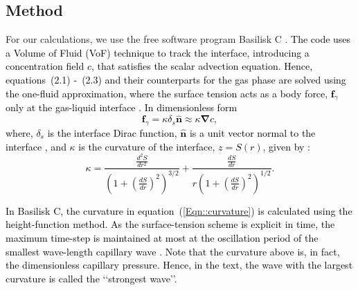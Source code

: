 \documentclass[final]{jfm}
\newcommand*\red{\textcolor{black}}
\begin{document}
\subsection{Method}\label{Sec::Method}
For our calculations, we use the free software program Basilisk C \citep{basiliskPopinet, popinet2015quadtree}.  \red{The code uses a Volume of Fluid (VoF) technique \citep{tryggvason2011direct} to track the interface, introducing a concentration field $c$, that satisfies the scalar advection equation. Hence, equations~\red{(2.1)} -~\red{(2.3)} and their counterparts for the gas phase are solved using the one-fluid approximation, where the surface tension acts as a body force, $\boldsymbol{f}_\gamma$ only at the gas-liquid interface \citep{brackbill1992continuum, popinet2009accurate}. In dimensionless form}
\red{\begin{equation}\label{Eqn::SurfaceTension}
		\boldsymbol{f}_\gamma = \kappa\delta_s\hat{\boldsymbol{n}} \approx \kappa\boldsymbol{\nabla}c,
\end{equation}}
%
\red{where, $\delta_s$ is the interface Dirac function, $\hat{\boldsymbol{n}}$ is a unit vector normal to the interface \citep{tryggvason2011direct}, and $\kappa$ is the curvature of the interface, $z = S(r)$, given by \citet[p.~14-16]{deserno2004notes}:
	\begin{equation}\label{Eqn::curvature}
		\kappa = \frac{\frac{d^2S}{dr^2}}{\left(1 + \left(\frac{dS}{dr}\right)^2\right)^{3/2}} + \frac{\frac{dS}{dr}}{r\left(1 + \left(\frac{dS}{dr}\right)^2\right)^{1/2}}.
\end{equation}}

\red{In Basilisk C, the curvature in equation~(\ref{Eqn::curvature}) is calculated using the height-function method.  As the surface-tension scheme is explicit in time, the maximum time-step is maintained at most at the oscillation period of the smallest wave-length capillary wave \citep{popinet2009accurate, basiliskPopinet2}.}
\red{Note that the curvature above is, in fact, the dimensionless capillary pressure. Hence, in the text, the wave with the largest curvature is called the \lq\lq strongest wave\rq\rq.}
\end{document}

